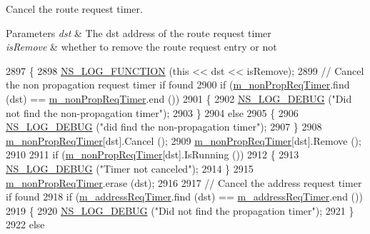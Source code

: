 Cancel the route request timer. 


\begin{DoxyParams}{Parameters}
{\em dst} & The dst address of the route request timer \\
\hline
{\em is\+Remove} & whether to remove the route request entry or not \\
\hline
\end{DoxyParams}

\begin{DoxyCode}
2897 \{
2898   \hyperlink{log-macros-disabled_8h_a90b90d5bad1f39cb1b64923ea94c0761}{NS\_LOG\_FUNCTION} (\textcolor{keyword}{this} << dst << isRemove);
2899   \textcolor{comment}{// Cancel the non propagation request timer if found}
2900   \textcolor{keywordflow}{if} (\hyperlink{classns3_1_1dsr_1_1DsrRouting_a0936df610f90f7e79c24a2a8cdea6c14}{m\_nonPropReqTimer}.find (dst) == \hyperlink{classns3_1_1dsr_1_1DsrRouting_a0936df610f90f7e79c24a2a8cdea6c14}{m\_nonPropReqTimer}.end ())
2901     \{
2902       \hyperlink{group__logging_ga413f1886406d49f59a6a0a89b77b4d0a}{NS\_LOG\_DEBUG} (\textcolor{stringliteral}{"Did not find the non-propagation timer"});
2903     \}
2904   \textcolor{keywordflow}{else}
2905     \{
2906       \hyperlink{group__logging_ga413f1886406d49f59a6a0a89b77b4d0a}{NS\_LOG\_DEBUG} (\textcolor{stringliteral}{"did find the non-propagation timer"});
2907     \}
2908   \hyperlink{classns3_1_1dsr_1_1DsrRouting_a0936df610f90f7e79c24a2a8cdea6c14}{m\_nonPropReqTimer}[dst].Cancel ();
2909   \hyperlink{classns3_1_1dsr_1_1DsrRouting_a0936df610f90f7e79c24a2a8cdea6c14}{m\_nonPropReqTimer}[dst].Remove ();
2910 
2911   \textcolor{keywordflow}{if} (\hyperlink{classns3_1_1dsr_1_1DsrRouting_a0936df610f90f7e79c24a2a8cdea6c14}{m\_nonPropReqTimer}[dst].IsRunning ())
2912     \{
2913       \hyperlink{group__logging_ga413f1886406d49f59a6a0a89b77b4d0a}{NS\_LOG\_DEBUG} (\textcolor{stringliteral}{"Timer not canceled"});
2914     \}
2915   \hyperlink{classns3_1_1dsr_1_1DsrRouting_a0936df610f90f7e79c24a2a8cdea6c14}{m\_nonPropReqTimer}.erase (dst);
2916 
2917   \textcolor{comment}{// Cancel the address request timer if found}
2918   \textcolor{keywordflow}{if} (\hyperlink{classns3_1_1dsr_1_1DsrRouting_a47174823b0622573b681afc40d6ea558}{m\_addressReqTimer}.find (dst) == \hyperlink{classns3_1_1dsr_1_1DsrRouting_a47174823b0622573b681afc40d6ea558}{m\_addressReqTimer}.end ())
2919     \{
2920       \hyperlink{group__logging_ga413f1886406d49f59a6a0a89b77b4d0a}{NS\_LOG\_DEBUG} (\textcolor{stringliteral}{"Did not find the propagation timer"});
2921     \}
2922   \textcolor{keywordflow}{else}

\end{DoxyCode}
